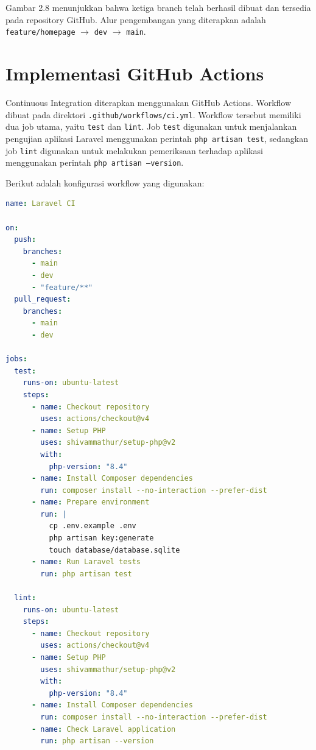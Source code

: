 \documentclass[a4paper,oneside,11pt]{book}
\begin{document}

Gambar 2.8 menunjukkan bahwa ketiga branch telah berhasil dibuat dan tersedia pada repository GitHub. Alur pengembangan yang diterapkan adalah \texttt{feature/homepage} $\rightarrow$ \texttt{dev} $\rightarrow$ \texttt{main}.

\section{Implementasi GitHub Actions}

Continuous Integration diterapkan menggunakan GitHub Actions. Workflow dibuat pada direktori \texttt{.github/workflows/ci.yml}. Workflow tersebut memiliki dua job utama, yaitu \texttt{test} dan \texttt{lint}. Job \texttt{test} digunakan untuk menjalankan pengujian aplikasi Laravel menggunakan perintah \texttt{php artisan test}, sedangkan job \texttt{lint} digunakan untuk melakukan pemeriksaan terhadap aplikasi menggunakan perintah \texttt{php artisan --version}.

Berikut adalah konfigurasi workflow yang digunakan:

\begin{lstlisting}[language=yaml]
name: Laravel CI

on:
  push:
    branches:
      - main
      - dev
      - "feature/**"
  pull_request:
    branches:
      - main
      - dev

jobs:
  test:
    runs-on: ubuntu-latest
    steps:
      - name: Checkout repository
        uses: actions/checkout@v4
      - name: Setup PHP
        uses: shivammathur/setup-php@v2
        with:
          php-version: "8.4"
      - name: Install Composer dependencies
        run: composer install --no-interaction --prefer-dist
      - name: Prepare environment
        run: |
          cp .env.example .env
          php artisan key:generate
          touch database/database.sqlite
      - name: Run Laravel tests
        run: php artisan test

  lint:
    runs-on: ubuntu-latest
    steps:
      - name: Checkout repository
        uses: actions/checkout@v4
      - name: Setup PHP
        uses: shivammathur/setup-php@v2
        with:
          php-version: "8.4"
      - name: Install Composer dependencies
        run: composer install --no-interaction --prefer-dist
      - name: Check Laravel application
        run: php artisan --version
\end{lstlisting}
\end{document}
